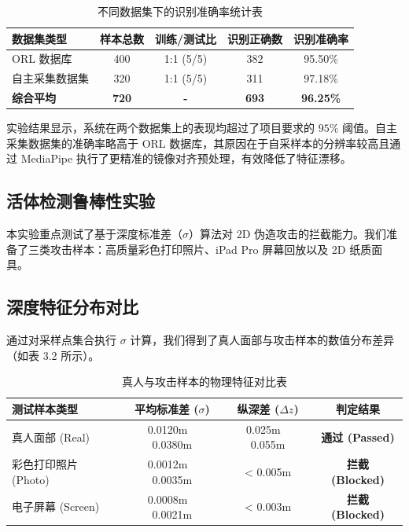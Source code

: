 \begin{table}[htbp]
\centering
\caption{不同数据集下的识别准确率统计表}
\label{tab:accuracy}
\begin{tabular}{l|c|c|c|c}
\hline
\textbf{数据集类型} & \textbf{样本总数} & \textbf{训练/测试比} & \textbf{识别正确数} & \textbf{识别准确率} \\ \hline
ORL 数据库      & 400            & 1:1 (5/5)         & 382              & 95.50\%          \\ \hline
自主采集数据集  & 320            & 1:1 (5/5)         & 311              & 97.18\%          \\ \hline
\textbf{综合平均} & \textbf{720}   & \textbf{-}        & \textbf{693}     & \textbf{96.25\%} \\ \hline
\end{tabular}
\end{table}

实验结果显示，系统在两个数据集上的表现均超过了项目要求的 $95\%$ 阈值。自主采集数据集的准确率略高于 ORL 数据库，其原因在于自采样本的分辨率较高且通过 MediaPipe 执行了更精准的镜像对齐预处理，有效降低了特征漂移。

\subsection{活体检测鲁棒性实验}

本实验重点测试了基于深度标准差（$\sigma$）算法对 2D 伪造攻击的拦截能力。我们准备了三类攻击样本：高质量彩色打印照片、iPad Pro 屏幕回放以及 2D 纸质面具。

\subsection{深度特征分布对比}

通过对采样点集合执行 $\sigma$ 计算，我们得到了真人面部与攻击样本的数值分布差异（如表 3.2 所示）。

\begin{table}[htbp]
\centering
\caption{真人与攻击样本的物理特征对比表}
\label{tab:liveness}
\begin{tabular}{l|c|c|c}
\hline
\textbf{测试样本类型} & \textbf{平均标准差 ($\sigma$)} & \textbf{纵深差 ($\Delta z$)} & \textbf{判定结果} \\ \hline
真人面部 (Real)      & 0.0120m ~ 0.0380m         & 0.025m ~ 0.055m           & \textbf{通过 (Passed)} \\ \hline
彩色打印照片 (Photo)  & 0.0012m ~ 0.0035m         & < 0.005m                  & \textbf{拦截 (Blocked)} \\ \hline
电子屏幕 (Screen)    & 0.0008m ~ 0.0021m         & < 0.003m                  & \textbf{拦截 (Blocked)} \\ \hline
\end{tabular}
\end{table}

